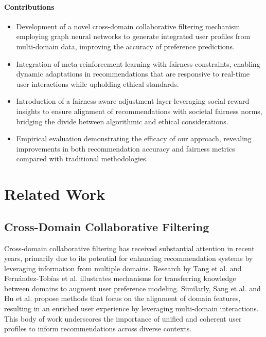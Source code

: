 \documentclass{article} %
\begin{document}
\paragraph{Contributions}
\begin{itemize}
    \item Development of a novel cross-domain collaborative filtering mechanism employing graph neural networks to generate integrated user profiles from multi-domain data, improving the accuracy of preference predictions.
    \item Integration of meta-reinforcement learning with fairness constraints, enabling dynamic adaptations in recommendations that are responsive to real-time user interactions while upholding ethical standards.
    \item Introduction of a fairness-aware adjustment layer leveraging social reward insights to ensure alignment of recommendations with societal fairness norms, bridging the divide between algorithmic and ethical considerations.
    \item Empirical evaluation demonstrating the efficacy of our approach, revealing improvements in both recommendation accuracy and fairness metrics compared with traditional methodologies.
\end{itemize}


\section{Related Work}

\subsection{Cross-Domain Collaborative Filtering}

Cross-domain collaborative filtering has received substantial attention in recent years, primarily due to its potential for enhancing recommendation systems by leveraging information from multiple domains. Research by Tang et al. \citep{tang2012cross} and Fernández-Tobías et al. \citep{fernandez2012cross} illustrates mechanisms for transferring knowledge between domains to augment user preference modeling. Similarly, Sang et al. \citep{sang2015effective} and Hu et al. \citep{hu2018conet} propose methods that focus on the alignment of domain features, resulting in an enriched user experience by leveraging multi-domain interactions. This body of work underscores the importance of unified and coherent user profiles to inform recommendations across diverse contexts.
\end{document}
